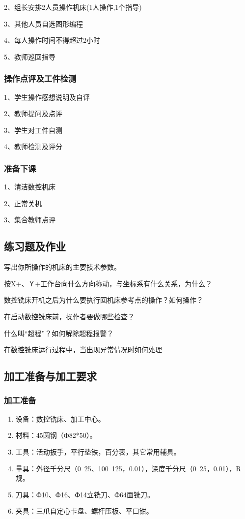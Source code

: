 2、组长安排2人员操作机床(1人操作,1个指导)

3、其他人员自选图形编程

4、每人操作时间不得超过2小时

5、教师巡回指导
\subsubsection{操作点评及工件检测}
1、学生操作感想说明及自评

2、教师提问及点评

3、学生对工件自测

4、教师检测及评分
\subsubsection{准备下课}
1、清洁数控机床

2、正常关机

3、集合教师点评

\subsection{练习题及作业}
\begin{compactenum}[1、]
\item 写出你所操作的机床的主要技术参数。
\item 按X+、Ｙ+工作台向什么方向称动，与坐标系有什么关系，为什么？
\item 数控铣床开机之后为什么要执行回机床参考点的操作？如何操作？
\item 在启动数控铣床前，操作者要做哪些检查？
\item 什么叫“超程”？如何解除超程报警？
\item 在数控铣床运行过程中，当出现异常情况时如何处理
\end{compactenum}

\vfill
\subsection{加工准备与加工要求}
\subsubsection{加工准备}
\begin{enumerate}[1、]
\item 设备：数控铣床、加工中心。
\item 材料：45圆钢（Ф82*50）。
\item  工具：活动扳手，平行垫铁，百分表，其它常用辅具。
\item  
量具：外径千分尺（0~25、100~125，0.01），深度千分尺（0~25，0.01），R规。
\item  刀具：Ф10、Ф16、Ф14立铣刀、Ф64面铣刀。
\item  夹具：三爪自定心卡盘、螺杆压板、平口钳。
\end{enumerate}
